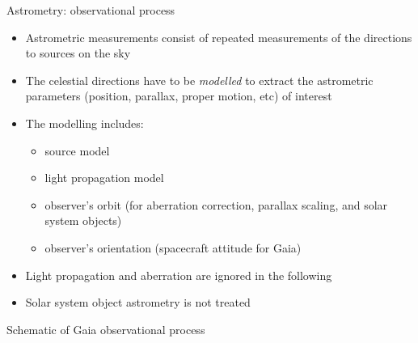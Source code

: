 \documentclass[smaller, aspectratio=169]{beamer}
\begin{document}
\begin{agaframe}{Astrometry: observational process}
  \begin{itemize}
    \item Astrometric measurements consist of repeated measurements of the directions to sources on
      the sky
    \item The celestial directions have to be {\em modelled} to extract the astrometric parameters
      (position, parallax, proper motion, etc) of interest
    \item The modelling includes:
      \begin{itemize}
        \item source model
        \item light propagation model
        \item observer's orbit (for aberration correction, parallax scaling, and solar system
          objects)
        \item observer's orientation (spacecraft attitude for Gaia)
      \end{itemize}
    \item Light propagation and aberration are ignored in the following
    \item Solar system object astrometry is not treated
  \end{itemize}
\end{agaframe}
%
%
\begin{agaframe}{Schematic of Gaia observational process}
\end{agaframe}
%
%
\end{document}
